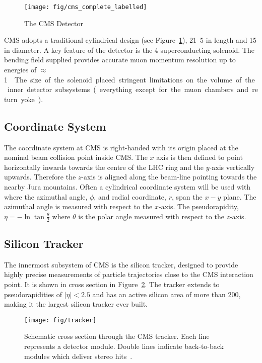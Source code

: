 \begin{figure}
\centering
\texttt{[image: fig/cms\_complete\_labelled]}
\caption{The CMS Detector}
\label{fig:expt_cms}
\end{figure}

\ac{CMS} adopts a traditional cylindrical design (see
Figure~\ref{fig:expt_cms}), \unit{21.5}{\metre} in length and \unit{15}{\metre}
in diameter. A key feature of the detector is the \unit{4}{\tesla}
superconducting solenoid. The bending field supplied provides accurate muon
momentum resolution up to energies of \unit{$\approx$ 1}{\TeV}. The size of the
solenoid placed stringent limitations on the volume of the inner detector
subsystems (everything except for the muon chambers and return yoke).

\subsection{Coordinate System}
The coordinate system at \ac{CMS} is right-handed with its origin placed at the
nominal beam collision point inside \ac{CMS}. The $x$ axis is then defined to
point horizontally inwards towards the centre of the \ac{LHC} ring and the
$y$-axis vertically upwards. Therefore the $z$-axis is aligned along the
beam-line pointing towards the nearby Jura mountains. Often a cylindrical
coordinate system will be used with where the azimuthal angle, $\phi$, and
radial coordinate, $r$, span the $x-y$ plane. The azimuthal angle is measured
with respect to the $x$-axis. The pseudorapidity, $\eta = - \ln \tan
\frac{\theta}{2}$ where $\theta$ is the polar angle measured with respect to the
$z$-axis.

\subsection{Silicon Tracker}
The innermost subsystem of \ac{CMS} is the silicon tracker, designed to provide
highly precise measurements of particle trajectories close to the CMS
interaction point. It is shown in cross section in
Figure~\ref{fig:expt_tracker}. The tracker extends to pseudorapidities of
$|\eta|<2.5$ and has an active silicon area of more than
\unit{200}{\metre\squared}, making it the largest silicon tracker ever built.

\begin{figure}[h!]
\texttt{[image: fig/tracker]}
\caption{Schematic cross section through the CMS tracker. Each line represents a
  detector module. Double lines indicate back-to-back modules which deliver
  stereo hits~\cite{cms_jinst}.}
\label{fig:expt_tracker}
\end{figure}

